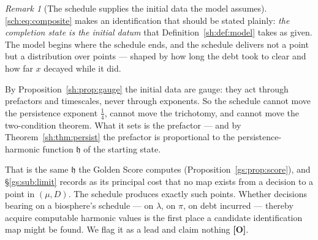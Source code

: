 \documentclass[11pt]{article}
\numberwithin{equation}{section}
\theoremstyle{plain}
\theoremstyle{definition}
\theoremstyle{remark}
\newtheorem{remark}[theorem]{Remark}
\newcommand{\hm}{\mathfrak{h}}
\begin{document}
\begin{remark}[The schedule supplies the initial data the model assumes]
\label{sch:rem:initialdata}
\eqref{sch:eq:composite} makes an identification that should be stated plainly:
\emph{the completion state is the initial datum} that
Definition~\ref{sh:def:model} takes as given. The model begins where the
schedule ends, and the schedule delivers not a point but a distribution
over points --- shaped by how long the debt took to clear and how far
$x$ decayed while it did.

By Proposition~\ref{sh:prop:gauge} the initial data are gauge: they act
through prefactors and timescales, never through exponents. So the
schedule cannot move the persistence exponent $\tfrac14$, cannot move
the trichotomy, and cannot move the two-condition theorem. What it sets
is the prefactor --- and by Theorem~\ref{sh:thm:persist} the prefactor
is proportional to the persistence-harmonic function $\hm$ of the
starting state.

That is the same $\hm$ the Golden Score computes
(Proposition~\ref{gs:prop:score}), and \S\ref{gs:sub:limit} records as
its principal cost that no map exists from a decision to a point in
$(\mu,D)$. The schedule produces exactly such points. Whether decisions
bearing on a biosphere's schedule --- on $\lambda$, on $\pi$, on debt
incurred --- thereby acquire computable harmonic values is the first
place a candidate identification map might be found. We flag it as a
lead and claim nothing \textbf{[O]}.
\end{remark}
\end{document}
